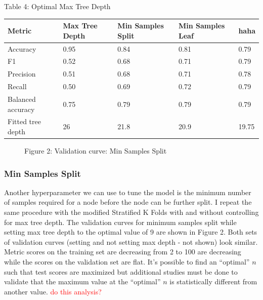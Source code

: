 \documentclass{article}
\newcommand\todo[1]{\textcolor{red}{#1}}
\begin{document}
\begin{center}
	Table 4: Optimal Max Tree Depth
	\begin{tabular}{ l l l l l }
		\hline
		Metric & Max Tree Depth & Min Samples Split & Min Samples Leaf & haha \\
		\hline
		Accuracy & 0.95 & 0.84 & 0.81 & 0.79 \\
		F1 & 0.52 & 0.68 & 0.71 & 0.79 \\
		Precision & 0.51 & 0.68 & 0.71 & 0.78 \\
		Recall & 0.50 & 0.69 & 0.72 & 0.79 \\
		Balanced accuracy & 0.75 & 0.79 & 0.79 & 0.79 \\
		Fitted tree depth & 26 & 21.8 & 20.9 & 19.75\\
		\hline 
		
		
	\end{tabular}
\end{center}

\begin{figure}
	\centering
	Figure 2: Validation curve: Min Samples Split
\end{figure}

\subsubsection*{Min Samples Split}
Another hyperparameter we can use to tune the model is the minimum number of samples required for a node before the node can be further split. I repeat the same procedure with the modified Stratified K Folds with and without controlling for max tree depth. The validation curves for minimum samples split while setting max tree depth to the optimal value of 9 are shown in Figure 2. Both sets of validation curves (setting and not setting max depth - not shown) look similar. Metric scores on the training set are decreasing from 2 to 100 are decreasing while the scores on the validation set are flat. It's possible to find an ``optimal'' $n$ such that test scores are maximized but additional studies must be done to validate that the maximum value at the ``optimal'' $n$ is statistically different from another value. \todo{do this analysis?}
\end{document}
